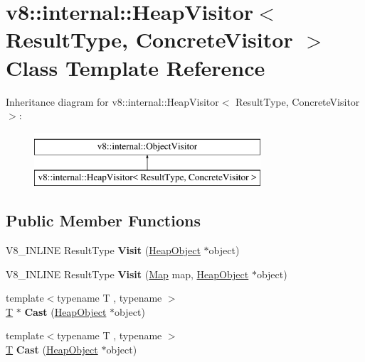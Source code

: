 \hypertarget{classv8_1_1internal_1_1HeapVisitor}{}\section{v8\+:\+:internal\+:\+:Heap\+Visitor$<$ Result\+Type, Concrete\+Visitor $>$ Class Template Reference}
\label{classv8_1_1internal_1_1HeapVisitor}
Inheritance diagram for v8\+:\+:internal\+:\+:Heap\+Visitor$<$ Result\+Type, Concrete\+Visitor $>$\+:\begin{figure}[H]
\begin{center}
\leavevmode
\includegraphics[height=2.000000cm]{classv8_1_1internal_1_1HeapVisitor}
\end{center}
\end{figure}
\subsection*{Public Member Functions}
\begin{DoxyCompactItemize}
\item 
\mbox{\label{classv8_1_1internal_1_1HeapVisitor_ac1c57af9bd875ccf04d842f28f3ad1f1}} 
V8\+\_\+\+I\+N\+L\+I\+NE Result\+Type {\bfseries Visit} (\mbox{\hyperlink{classv8_1_1internal_1_1HeapObject}{Heap\+Object}} $\ast$object)
\item 
\mbox{\label{classv8_1_1internal_1_1HeapVisitor_a4c88cabe1e471c5fe345980872058042}} 
V8\+\_\+\+I\+N\+L\+I\+NE Result\+Type {\bfseries Visit} (\mbox{\hyperlink{classv8_1_1internal_1_1Map}{Map}} map, \mbox{\hyperlink{classv8_1_1internal_1_1HeapObject}{Heap\+Object}} $\ast$object)
\item 
\mbox{\label{classv8_1_1internal_1_1HeapVisitor_aaebf4d317254e72d1e53daa7d4d3cfb6}} 
{\footnotesize template$<$typename T , typename $>$ }\\\mbox{\hyperlink{classv8_1_1internal_1_1torque_1_1T}{T}} $\ast$ {\bfseries Cast} (\mbox{\hyperlink{classv8_1_1internal_1_1HeapObject}{Heap\+Object}} $\ast$object)
\item 
\mbox{\label{classv8_1_1internal_1_1HeapVisitor_abe886e3af709a8c8fb5fa56301df8120}} 
{\footnotesize template$<$typename T , typename $>$ }\\\mbox{\hyperlink{classv8_1_1internal_1_1torque_1_1T}{T}} {\bfseries Cast} (\mbox{\hyperlink{classv8_1_1internal_1_1HeapObject}{Heap\+Object}} $\ast$object)
\end{DoxyCompactItemize}
